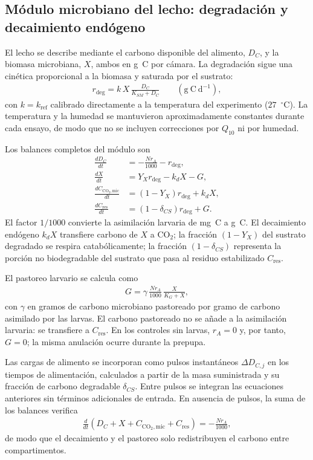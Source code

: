 \subsection{Módulo microbiano del lecho: degradación y decaimiento endógeno}
\label{sup:microbiano}
El lecho se describe mediante el carbono disponible del alimento, $D_C$, y la
biomasa microbiana, $X$, ambos en g~C por cámara. La degradación sigue una
cinética proporcional a la biomasa y saturada por el sustrato:
\begin{align*}
r_{\mathrm{deg}}
  = k\,X\,\frac{D_C}{K_{SM}+D_C}
  \qquad (\mathrm{g~C~d^{-1}}),
\end{align*}
con $k=k_{\mathrm{ref}}$ calibrado directamente a la temperatura del
experimento ($27$~$^\circ$C). La temperatura y la humedad se mantuvieron
aproximadamente constantes durante cada ensayo, de modo que no se incluyen
correcciones por $Q_{10}$ ni por humedad.

Los balances completos del módulo son
\begin{align*}
\frac{dD_C}{dt}
  &= -\frac{N r_A}{1000} - r_{\mathrm{deg}},\\
\frac{dX}{dt}
  &= Y_X r_{\mathrm{deg}} - k_d X - G,\\
\frac{dC_{\mathrm{CO_2,mic}}}{dt}
  &= (1-Y_X)r_{\mathrm{deg}} + k_d X,\\
\frac{dC_{\mathrm{res}}}{dt}
  &= (1-\delta_{CS})r_{\mathrm{deg}} + G.
\end{align*}
El factor $1/1000$ convierte la asimilación larvaria de mg~C a g~C. El
decaimiento endógeno $k_d X$ transfiere carbono de $X$ a CO$_2$; la fracción
$(1-Y_X)$ del sustrato degradado se respira catabólicamente; la fracción
$(1-\delta_{CS})$ representa la porción no biodegradable del sustrato que
pasa al residuo estabilizado $C_{\mathrm{res}}$.

El pastoreo larvario se calcula como
\begin{align*}
G
  = \gamma\,\frac{N r_A}{1000}\,\frac{X}{K_G+X},
\end{align*}
con $\gamma$ en gramos de carbono microbiano pastoreado por gramo de carbono
asimilado por las larvas. El carbono pastoreado no se añade a la asimilación
larvaria: se transfiere a $C_{\mathrm{res}}$. En los controles sin larvas,
$r_A=0$ y, por tanto, $G=0$; la misma anulación ocurre durante la prepupa.

Las cargas de alimento se incorporan como pulsos instantáneos
$\Delta D_{C,j}$ en los tiempos de alimentación, calculados a partir de la
masa suministrada y su fracción de carbono degradable $\delta_{CS}$. Entre
pulsos se integran las ecuaciones anteriores sin términos adicionales de
entrada. En ausencia de pulsos, la suma de los balances verifica
\begin{align*}
\frac{d}{dt}
\left(D_C+X+C_{\mathrm{CO_2,mic}}+C_{\mathrm{res}}\right)
  = -\frac{N r_A}{1000},
\end{align*}
de modo que el decaimiento y el pastoreo solo redistribuyen el carbono entre
compartimentos.

